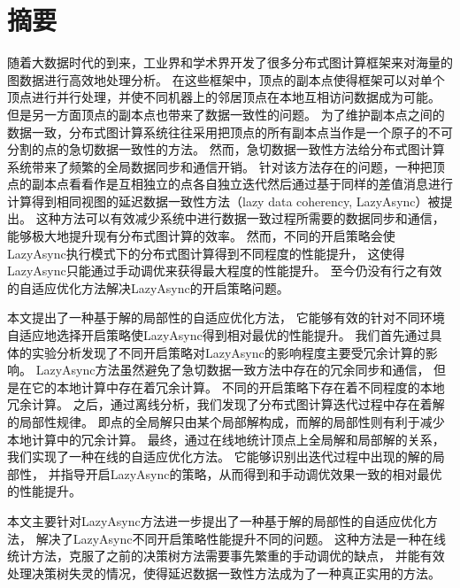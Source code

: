 \maketitle%
\MAKETITLE%
\makedeclaration%
\intobmk\chapter*{摘\quad 要}%
\setcounter{page}{1}%

随着大数据时代的到来，工业界和学术界开发了很多分布式图计算框架来对海量的图数据进行高效地处理分析。
在这些框架中，顶点的副本点使得框架可以对单个顶点进行并行处理，并使不同机器上的邻居顶点在本地互相访问数据成为可能。
但是另一方面顶点的副本点也带来了数据一致性的问题。
为了维护副本点之间的数据一致，分布式图计算系统往往采用把顶点的所有副本点当作是一个原子的不可分割的点的急切数据一致性的方法。
然而，急切数据一致性方法给分布式图计算系统带来了频繁的全局数据同步和通信开销。
针对该方法存在的问题，一种把顶点的副本点看看作是互相独立的点各自独立迭代然后通过基于同样的差值消息进行计算得到相同视图的延迟数据一致性方法（lazy data coherency, LazyAsync）被提出。
这种方法可以有效减少系统中进行数据一致过程所需要的数据同步和通信，能够极大地提升现有分布式图计算的效率。
然而，不同的开启策略会使LazyAsync执行模式下的分布式图计算得到不同程度的性能提升，
这使得LazyAsync只能通过手动调优来获得最大程度的性能提升。
至今仍没有行之有效的自适应优化方法解决LazyAsync的开启策略问题。

本文提出了一种基于解的局部性的自适应优化方法，
它能够有效的针对不同环境自适应地选择开启策略使LazyAsync得到相对最优的性能提升。
我们首先通过具体的实验分析发现了不同开启策略对LazyAsync的影响程度主要受冗余计算的影响。
LazyAsync方法虽然避免了急切数据一致方法中存在的冗余同步和通信，
但是在它的本地计算中存在着冗余计算。
不同的开启策略下存在着不同程度的本地冗余计算。
之后，通过离线分析，我们发现了分布式图计算迭代过程中存在着解的局部性规律。
即点的全局解只由某个局部解构成，而解的局部性则有利于减少本地计算中的冗余计算。
最终，通过在线地统计顶点上全局解和局部解的关系，
我们实现了一种在线的自适应优化方法。
它能够识别出迭代过程中出现的解的局部性，
并指导开启LazyAsync的策略，从而得到和手动调优效果一致的相对最优的性能提升。

本文主要针对LazyAsync方法进一步提出了一种基于解的局部性的自适应优化方法，
解决了LazyAsync不同开启策略性能提升不同的问题。
这种方法是一种在线统计方法，克服了之前的决策树方法需要事先繁重的手动调优的缺点，
并能有效处理决策树失灵的情况，使得延迟数据一致性方法成为了一种真正实用的方法。




